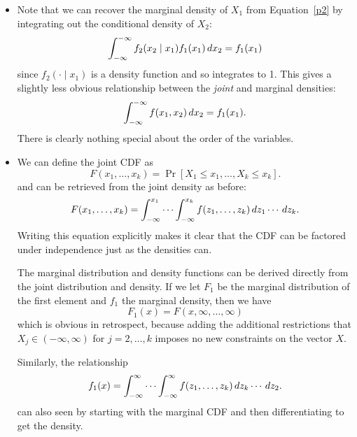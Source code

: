 \begin{itemize}[leftmargin=0pt]
\item Note that we can recover the marginal density of $X_1$ from
  Equation~\eqref{p2} by integrating out the conditional density of
  $X_2$:
  \begin{equation*}
    \int_{-\infty}^{-\infty} f_2(x_2 \mid x_1) f_1(x_1) \,dx_2 = f_1(x_1)
  \end{equation*}
  since $f_2(\cdot \mid x_1)$ is a density function and so integrates to 1.
  This gives a slightly less obvious relationship between the
  \emph{joint} and marginal densities:
  \begin{equation*}
    \int_{-\infty}^{-\infty} f(x_1, x_2) \,dx_2 = f_1(x_1).
  \end{equation*}
  There is clearly nothing special about the order of the variables.

\item We can define the joint CDF as
  \begin{equation*}
    F(x_1,\dots,x_k) = \Pr[X_1 \leq x_1,\dots, X_k \leq x_k].
  \end{equation*}
  and can be retrieved from the joint density as before:
  \begin{equation*}
    F(x_1,\dots,x_k) = \int_{-\infty}^{x_1} \cdots \int_{-\infty}^{x_k} f(z_1,\dots,z_k) \,dz_1 \cdots \,dz_k.
  \end{equation*}
  Writing this equation explicitly makes it clear that the CDF can be
  factored under independence just as the densities can.

  The marginal distribution and density functions can be derived
  directly from the joint distribution and density.  If we let $F_1$ be
  the marginal distribution of the first element and $f_1$ the marginal
  density, then we have
  \begin{equation*}
    F_1(x) = F(x, \infty,\dots,\infty)
  \end{equation*}
  which is obvious in retrospect, because adding the additional
  restrictions that $X_j \in (-\infty, \infty)$ for $j = 2,\dots,k$ imposes no new
  constraints on the vector $X$.

  Similarly, the relationship
  \begin{equation*}
    f_1(x) = \int_{-\infty}^\infty \cdots \int_{-\infty}^\infty f(z_1,\dots,z_k) \,dz_k \cdots \,dz_2.
  \end{equation*}
  can also seen by starting with the marginal CDF and then
  differentiating to get the density.

\end{itemize}


